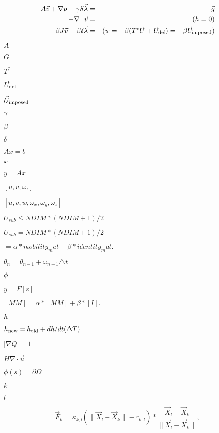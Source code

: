 \documentclass{article}
\begin{document}
\begin{eqnarray*}
    A \vec{v} + \nabla p - \gamma S \vec{\lambda} &=& \vec{g} \\
    -\nabla \cdot \vec{v}   &=& (h = 0) \\
    -\beta J \vec{v}   - \beta \delta \vec{\lambda}  &=& (w = -\beta (T^{*}\vec{U}+ \vec{U}_{\mbox{\scriptsize def}}) =
-\beta \vec{U}_{\mbox{\scriptsize imposed}})
  \end{eqnarray*}
\pagebreak

$ A $
\pagebreak

$ G $
\pagebreak

$ T^{*} $
\pagebreak

$ \vec{U}_{\mbox{\scriptsize def}} $
\pagebreak

$ \vec{U}_{\mbox{\scriptsize imposed}} $
\pagebreak

$ \gamma $
\pagebreak

$ \beta $
\pagebreak

$ \delta $
\pagebreak

$Ax=b$
\pagebreak

$x$
\pagebreak

$y=Ax$
\pagebreak

$[u,v,\omega_z]$
\pagebreak

$[u,v,w,\omega_x,\omega_y,\omega_z]$
\pagebreak

$ U_{sub} \leq NDIM * (NDIM + 1) / 2 $
\pagebreak

$ U_{sub} = NDIM * (NDIM + 1) / 2 $
\pagebreak

$  = \alpha * mobility_mat + \beta * identity_mat. $
\pagebreak

$ \theta_n = \theta_{n-1} + \omega_{n-1} \triangle t $
\pagebreak

$ \phi $
\pagebreak

$y=F[x]$
\pagebreak

$ [MM] = \alpha*[MM] + \beta*[I]. $
\pagebreak

$ h $
\pagebreak

$ h_{\rm new} = h_{\rm old} + dh/dt (\Delta T) $
\pagebreak

$ |\nabla Q | = 1 $
\pagebreak

$ H \nabla \cdot \vec{u} $
\pagebreak

$ \phi(s) = \partial \Omega
$
\pagebreak

$ k $
\pagebreak

$ l $
\pagebreak

\[
 
       \vec{F}_k = \kappa_{k,l} \left( \|\vec{X}_{l} - \vec{X}_{k}\| - r_{k,l} \right)
*\frac{\vec{X}_{l} - \vec{X}_{k}}{\|\vec{X}_{l} - \vec{X}_{k}\|},
 
  \]
\pagebreak
\end{document}
